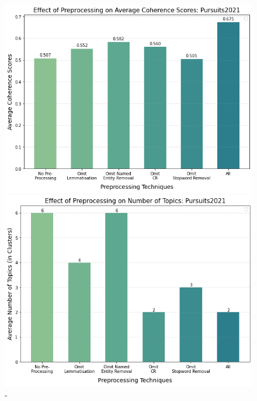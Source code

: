 \begin{figure}[H]
  \centering
    \begin{minipage}[t]{.49\linewidth}
      \centering
      \includegraphics[width=\linewidth]{images/eval/coherence_preprocess.png}
      \caption{-}
      \label{fig:preprocess_topic}
    \end{minipage}
    \begin{minipage}[t]{.49\textwidth}
      \centering
      \includegraphics[width=\linewidth]{images/eval/preprocessingTopicNo.png}
      \caption{-}
       \label{fig:pre-processing_topic_no}
    \end{minipage}
  \end{figure}

